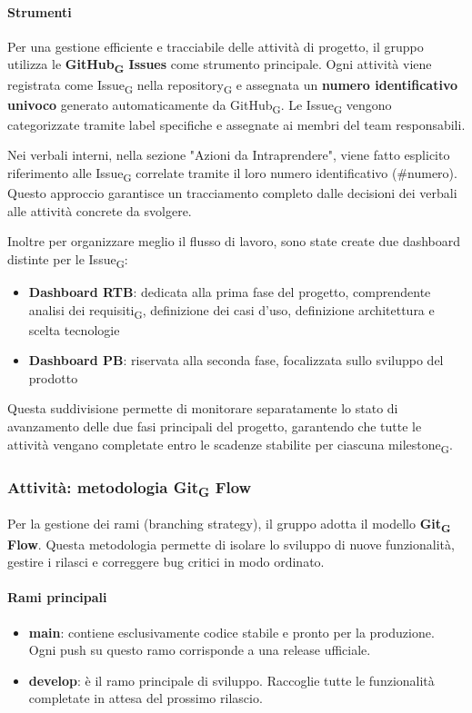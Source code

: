 \documentclass[11pt,a4paper]{article}
\newcommand{\gls}[1]{#1\textsubscript{G}}
\begin{document}
\paragraph{Strumenti}
Per una gestione efficiente e tracciabile delle attività di progetto, il gruppo utilizza le \textbf{\gls{GitHub} Issues} come strumento principale. Ogni attività viene registrata come \gls{Issue} nella \gls{repository} e assegnata un \textbf{numero identificativo univoco} generato automaticamente da \gls{GitHub}. Le \gls{Issue} vengono categorizzate tramite label specifiche e assegnate ai membri del team responsabili.

Nei verbali interni, nella sezione "Azioni da Intraprendere", viene fatto esplicito riferimento alle \gls{Issue} correlate tramite il loro numero identificativo (\#numero). Questo approccio garantisce un tracciamento completo dalle decisioni dei verbali alle attività concrete da svolgere.

Inoltre per organizzare meglio il flusso di lavoro, sono state create due dashboard distinte per le \gls{Issue}:
\begin{itemize}
    \item \textbf{Dashboard RTB}: dedicata alla prima fase del progetto, comprendente \gls{analisi dei requisiti}, definizione dei casi d'uso, definizione architettura e scelta tecnologie
    
    \item \textbf{Dashboard PB}: riservata alla seconda fase, focalizzata sullo sviluppo del prodotto
\end{itemize}

Questa suddivisione permette di monitorare separatamente lo stato di avanzamento delle due fasi principali del progetto, garantendo che tutte le attività vengano completate entro le scadenze stabilite per ciascuna \gls{milestone}.


\subsubsection{Attività: metodologia \gls{Git} Flow}
Per la gestione dei rami (branching strategy), il gruppo adotta il modello \textbf{\gls{Git} Flow}. Questa metodologia permette di isolare lo sviluppo di nuove funzionalità, gestire i rilasci e correggere bug critici in modo ordinato.

\paragraph{Rami principali}
\begin{itemize}
    \item \textbf{main}: contiene esclusivamente codice stabile e pronto per la produzione. Ogni push su questo ramo corrisponde a una release ufficiale.
    \item \textbf{develop}: è il ramo principale di sviluppo. Raccoglie tutte le funzionalità completate in attesa del prossimo rilascio.
\end{itemize}
\end{document}
